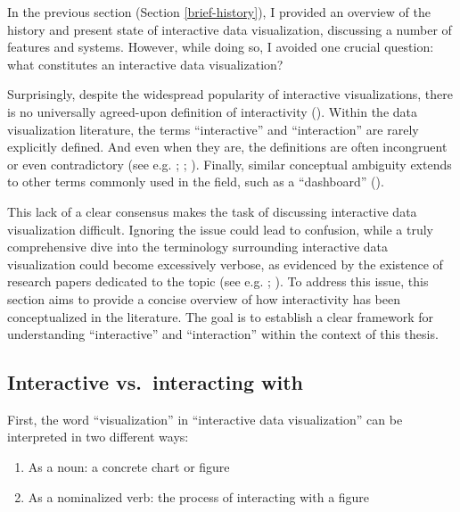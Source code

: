 \documentclass[
]{book}
\providecommand{\tightlist}{%
  \setlength{\itemsep}{0pt}\setlength{\parskip}{0pt}}
\theoremstyle{definition}
\theoremstyle{definition}
\theoremstyle{definition}
\theoremstyle{definition}
\theoremstyle{remark}
\begin{document}
In the previous section (Section \ref{brief-history}), I provided an overview of the history and present state of interactive data visualization, discussing a number of features and systems. However, while doing so, I avoided one crucial question: what constitutes an interactive data visualization?

Surprisingly, despite the widespread popularity of interactive visualizations, there is no universally agreed-upon definition of interactivity (). Within the data visualization literature, the terms ``interactive'' and ``interaction'' are rarely explicitly defined. And even when they are, the definitions are often incongruent or even contradictory (see e.g. ; ; ). Finally, similar conceptual ambiguity extends to other terms commonly used in the field, such as a ``dashboard'' ().

This lack of a clear consensus makes the task of discussing interactive data visualization difficult. Ignoring the issue could lead to confusion, while a truly comprehensive dive into the terminology surrounding interactive data visualization could become excessively verbose, as evidenced by the existence of research papers dedicated to the topic (see e.g. ; ). To address this issue, this section aims to provide a concise overview of how interactivity has been conceptualized in the literature. The goal is to establish a clear framework for understanding ``interactive'' and ``interaction'' within the context of this thesis.

\subsection{Interactive vs.~interacting with}\label{interactive-interacting}

First, the word ``visualization'' in ``interactive data visualization'' can be interpreted in two different ways:

\begin{enumerate}
\def\labelenumi{\arabic{enumi}.}
\tightlist
\item
  As a noun: a concrete chart or figure
\item
  As a nominalized verb: the process of interacting with a figure
\end{enumerate}
\end{document}
